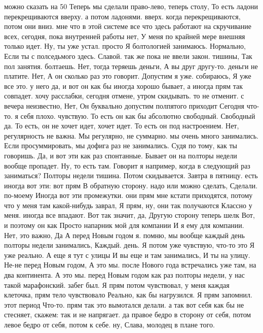 можно сказать на 50%
Теперь мы сделали право-лево, теперь столу, То есть ладони перекрещиваются вверху.
а потом ладонями.
вверх. когда перекрещиваются, потом они вниз.
мне что в этой системе все что здесь работают на скручивание всех,
сегодня, пока внутренней работы нет, У меня по крайней мере внешняя только идет. Ну, ты уже устал. просто Я болтологией занимаюсь. Нормально, Если
ты с полседьмого здесь.
Славой. так же пока не ввели закон.
тишины, Так пол занятия.
болтаешь. Нет, тогда теряешь деньги, А вы друг другу-то.
деньги не платите.
Нет, А он сколько раз это говорит. Допустим я уже.
собираюсь, Я уже все это.
у него да, и вот он как бы иногда хорошо бывает, а иногда прям так совпадет. хочу расслабки, сегодня отмене, утром скидывать.
то не отменит. с вечера неизвестно, Нет, Он буквально допустим полпятого приходит Сегодня что-то.
я себя плохо.
чувствую.
То есть он как бы абсолютно свободный.
Свободный да.
То есть, он не хочет идет, хочет идет.
То есть он под настроением.
Нет, регулярность не важна.
Мы регулярно, не суммарно. мы очень много занимались.
Если просуммировать, мы дофига раз не занимались.
Судя по тому, как ты говоришь.
Да, и вот эти как раз спонтанные.
Бывает он на полторы недели вообще пропадет.
Ну, то есть там.
Говорит я например, когда в следующий раз заниматься?
Полторы недели тишина.
Потом скидывается.
Завтра в пятницу.
есть иногда вот эти:
вот прям В обратную сторону. надо или можно сделать, Сделали.
по-моему Иногда вот эти промежутки.
они прям мне кстати приходятся, потому что у меня там какой-нибудь заврал, Я прям, ну, они так получаются Классно у меня.
иногда все впадают. Вот так значит, да, Другую сторону теперь шелк Вот, и поэтому он как Просто напарник мой для компании И я ему для компании.
Нет, это важно, Да А перед Новым годом я.
помню, мы вообще каждый день полторы недели занимались, Каждый.
день. Я потом уже чувствую, что-то это Я уже реально. А еще я тут с улицы И вы еще и там занимались, И ты на улицу.
Не-не перед Новым годом, А это мы. после Нового года встречались уже там, на два континента. А это мы.
перед Новым годом как раз полторы недели, у нас такой марафонский.
забег был. Я прям потом чувствовал, у меня каждая клеточка, прям тело чувствовало Реально, как бы нагрузился. Я прям запомнил.
этот период Что-то.
прям так это вымотался делали.
а так вот себя как бы не стесняет, скажем:
так и не напрягает. да правое бедро в сторону от себя, потом левое бедро от себя, потом к себе. ну, Слава, молодец в плане того.
